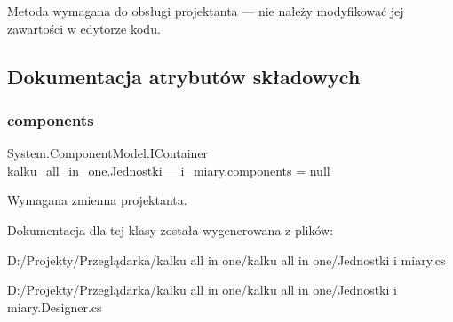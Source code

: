 Metoda wymagana do obsługi projektanta — nie należy modyfikować jej zawartości w edytorze kodu. 



\subsection{Dokumentacja atrybutów składowych}
\mbox{\label{classkalku__all__in__one_1_1_jednostki____i__miary_a7b1e52b4fd88b5cbd75f4e288e12291f}} 
\subsubsection{\texorpdfstring{components}{components}}
{\footnotesize\ttfamily System.\+Component\+Model.\+I\+Container kalku\+\_\+all\+\_\+in\+\_\+one.\+Jednostki\+\_\+\+\_\+i\+\_\+miary.\+components = null\hspace{0.3cm}{\ttfamily [private]}}



Wymagana zmienna projektanta. 



Dokumentacja dla tej klasy została wygenerowana z plików\+:\begin{DoxyCompactItemize}
\item 
D\+:/\+Projekty/\+Przeglądarka/kalku all in one/kalku all in one/Jednostki  i miary.\+cs\item 
D\+:/\+Projekty/\+Przeglądarka/kalku all in one/kalku all in one/Jednostki  i miary.\+Designer.\+cs\end{DoxyCompactItemize}

